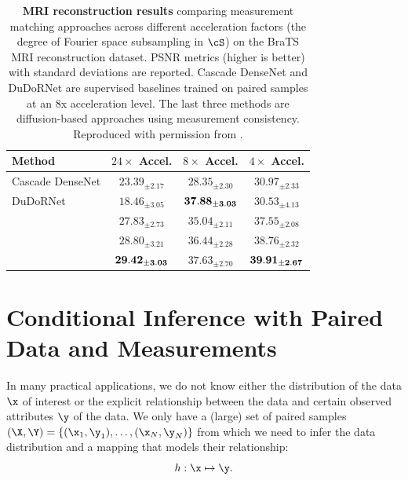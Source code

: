 \documentclass[../../book-main.tex]{subfiles}
\begin{document}
\begin{table}[t]
    \centering
    \begin{tabular}{@{}lccc@{}}
        \toprule
        Method & $24\times$ Accel. & $8\times$ Accel. & $4\times$ Accel. \\
        \midrule
        Cascade DenseNet & $23.39_{\pm 2.17}$ & $28.35_{\pm 2.30}$ &
        $30.97_{\pm 2.33}$ \\
        DuDoRNet & $18.46_{\pm 3.05}$ & $\bf 37.88_{\pm 3.03}$ &
        $30.53_{\pm 4.13}$ \\
        \textcite{song2020score} & $27.83_{\pm 2.73}$ & $35.04_{\pm
        2.11}$ & $37.55_{\pm 2.08}$ \\
        \textcite{NEURIPS2021_7d6044e9} & $28.80_{\pm 3.21}$ &
        $36.44_{\pm 2.28}$ & $38.76_{\pm 2.32}$ \\
        \textcite{song2022solving} & $\bf 29.42_{\pm 3.03}$ &
        $37.63_{\pm 2.70}$ & $\bf 39.91_{\pm 2.67}$ \\
        \bottomrule
    \end{tabular}
    \caption{\textbf{MRI reconstruction results} comparing measurement matching
        approaches across different acceleration factors (the degree of Fourier
        space subsampling in $\cS$) on the BraTS MRI
        reconstruction dataset. PSNR metrics (higher is better) with
        standard deviations are reported.
        Cascade DenseNet
        \cite{NEURIPS2019_1e48c442} and DuDoRNet \cite{9156506} are supervised
        baselines trained on paired samples at an 8x acceleration
        level. The last
        three methods are diffusion-based approaches using
        measurement consistency.
    Reproduced with permission from \textcite{song2022solving}.}
    \label{tab:mri-reconstruction}
\end{table}

\section{Conditional Inference with Paired Data and Measurements}
\label{sec:paired-data}
In many practical applications, we do not know either the
distribution of the data $\x$ of interest or the explicit
relationship between the data and certain observed attributes $\y$ of
the data. We only have a (large) set of paired samples $(\X, \Y) =
\{ (\x_1, \y_1), \ldots, (\x_N, \y_N) \}$ from which we need to infer
the data distribution and a mapping that models their relationship:
\begin{equation}
    h: \x \mapsto \y.
\end{equation}
\end{document}
